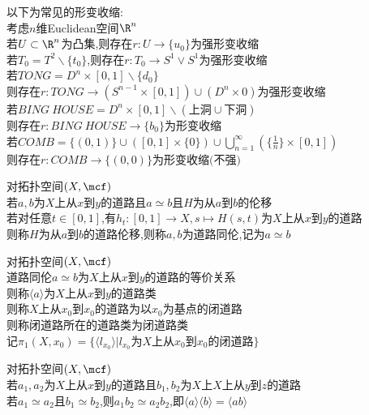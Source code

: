 \begin{zhu}
以下为常见的形变收缩:\\
考虑$n$维Euclidean空间$\R^n$\\
若$U\subset\R^n$为凸集,则存在$r:U\to\{u_0\}$为强形变收缩\\
若$T_0=T^2\backslash\{t_0\}$,则存在$r:T_0\to S^{1}\vee S^{1}$为强形变收缩\\
若$TONG=D^{n}\times[0,1]\backslash\{d_0\}$\\
则存在$r:TONG\to (S^{n-1}\times[0,1])\cup(D^{n}\times{0})$为强形变收缩\\
若$BING\  HOUSE=D^{n}\times[0,1]\backslash(\text{上洞}\cup\text{下洞})$\\
则存在$r:BING\ HOUSE\to \{b_0\}$为形变收缩\\
若$COMB=\{(0,1)\}\cup([0,1]\times\{0\})\cup\bigcup_{n=1}^{\infty}(\{\frac{1}{n}\}\times[0,1])$\\
则存在$r:COMB\to \{(0,0)\}$为形变收缩$($不强$)$
\end{zhu}

\begin{dingyi}
对拓扑空间$(X,\mcf)$\\
若$a,b$为$X$上从$x$到$y$的道路且$a\simeq b$且$H$为从$a$到$b$的伦移\\
若对任意$t\in[0,1]$,有$h_t:[0,1]\to X, s\mapsto H(s,t)$为$X$上从$x$到$y$的道路\\
则称$H$为从$a$到$b$的道路伦移,则称$a,b$为道路同伦,记为$a\simeq b$
\end{dingyi}

\begin{dingyi}
对拓扑空间$(X,\mcf)$\\
道路同伦$a\simeq b$为$X$上从$x$到$y$的道路的等价关系\\
则称$\langle a\rangle$为$X$上从$x$到$y$的道路类\\
则称$X$上从$x_0$到$x_0$的道路为以$x_0$为基点的闭道路\\
则称闭道路所在的道路类为闭道路类\\
记$\pi_1(X,x_0)=\{\langle l_{x_0}\rangle|l_{x_0}\text{为}X\text{上从}x_0\text{到}x_0\text{的闭道路}\}$
\end{dingyi}

\begin{dingli}
对拓扑空间$(X,\mcf)$\\
若$a_1,a_2$为$X$上从$x$到$y$的道路且$b_1,b_2$为$X$上$X$上从$y$到$z$的道路\\
若$a_1\simeq a_2$且$b_1\simeq b_2$,则$a_1b_2\simeq a_2b_2$,即$\langle a\rangle\langle b\rangle =\langle ab\rangle$
\end{dingli}

